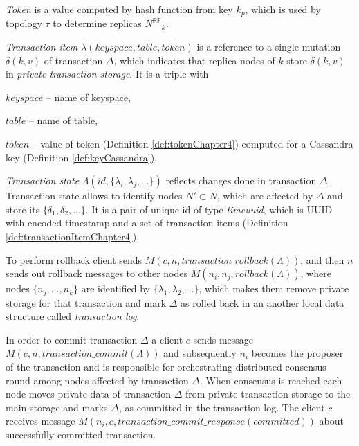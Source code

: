 \documentclass[runningheads,a4paper]{llncs}
\newcommand{\transaction}{$\Delta$\xspace}
\newcommand{\txRollbackMessage}{$\mathit{M}(c,n,\mathit{transaction\_rollback}(\Lambda))$\xspace}
\newcommand{\rollbackMessage}{$\mathit{M}(n_{i}, n_{j}, \mathit{rollback}(\Lambda))$\xspace}
\newcommand{\txCommitMessage}{$\mathit{M}(c,n, \mathit{transaction\_commit}(\Lambda))$\xspace}
\newcommand{\txCommitResonseMessage}{$\mathit{M}(n_{i},c,\mathit{transaction\_commit\_response}(committed))$\xspace}
\newcommand{\NRF}{\mathit{N^{\mathbb{RF}}}}
\newcommand{\mutation}[2]{$\delta(#1, #2)$\xspace}
\newcommand{\mutations}{$\{\delta_{1}, \delta_{2}, ...\}$\xspace}
\newcommand{\topology}{$\tau$\xspace}
\newcommand{\txItems}{$\{\lambda_{1}, \lambda_{2}, ...\}$\xspace}
\newcommand{\client}{$c$\xspace}
\newcommand{\node}[1]{$n_{#1}$\xspace}
\begin{document}
\begin{definition}
  \label{def:tokenChapter4}
  \emph{Token} is a value computed by hash function from key $k_p$, which is used by topology \topology to determine replicas $\NRF_k$.
\end{definition}

\begin{definition}
  \label{def:transactionItemChapter4}
  \emph{Transaction item} $\lambda(\mathit{keyspace}, \mathit{table}, \mathit{token})$ 
  is a reference to a single mutation \mutation{k}{v} of transaction \transaction, which indicates that replica nodes of $k$ store \mutation{k}{v} in \emph{private transaction storage}.  
  It is a triple with \begin{enumerate*}[label=\alph*)]
    \item $\mathit{keyspace}$ -- name of keyspace,
    \item $\mathit{table}$ -- name of table,
    \item $\mathit{token}$ -- value of token (Definition \ref{def:tokenChapter4}) computed for a Cassandra key (Definition \ref{def:keyCassandra}).
  \end{enumerate*}
\end{definition}

\begin{definition}
  \label{def:transactionStateChapter4}
  \emph{Transaction state} $\Lambda(\mathit{id}, \{\lambda_{i}, \lambda_{j}, ...\})$ reflects changes done in transaction \transaction. Transaction state allows to identify nodes $N' \subset N$, which are affected by \transaction and store its \mutations. It is a pair of unique id of type \emph{timeuuid}, which is UUID with encoded timestamp \cite{CassandraUUID} and a set of transaction items (Definition \ref{def:transactionItemChapter4}).
\end{definition}

To perform rollback client sends \txRollbackMessage, and then $n$ sends out rollback messages to other nodes \rollbackMessage, where nodes $\{n_j,...,n_k\}$ are identified by \txItems, which makes them remove private storage for that transaction and mark \transaction as rolled back in an another local data structure called \emph{transaction log}.

In order to commit transaction \transaction a client \client sends message \txCommitMessage and subsequently \node{i} becomes the proposer of the transaction and is responsible for orchestrating distributed consensus round among nodes affected by transaction \transaction. %
When consensus is reached each node moves private data of transaction \transaction from private transaction storage to the main storage and marks \transaction, as committed in the transaction log. The client \client receives message \txCommitResonseMessage about successfully committed transaction.
\end{document}
